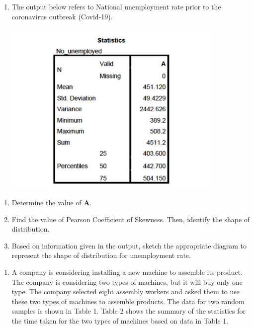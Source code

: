 \documentclass[
  a4paper,
  DIV=11,
  numbers=noendperiod,
  oneside]{scrreprt}
\providecommand{\tightlist}{%
  \setlength{\itemsep}{0pt}\setlength{\parskip}{0pt}}\usepackage{longtable,booktabs,array}
\begin{document}
\begin{enumerate}
\def\labelenumi{\arabic{enumi}.}
\setcounter{enumi}{4}
\tightlist
\item
  The output below refers to National unemployment rate prior to the
  coronavirus outbreak (Covid-19).

  \includegraphics[width=4.16667in,height=\textheight]{images/ch2/picture23.png}
\end{enumerate}

\begin{enumerate}
\def\labelenumi{\alph{enumi}.}
\tightlist
\item
  Determine the value of \textbf{A}.
\item
  Find the value of Pearson Coefficient of Skewness. Then, identify the
  shape of distribution.
\item
  Based on information given in the output, sketch the appropriate
  diagram to represent the shape of distribution for unemployment rate.
\end{enumerate}

\begin{enumerate}
\def\labelenumi{\arabic{enumi}.}
\setcounter{enumi}{5}
\tightlist
\item
  A company is considering installing a new machine to assemble its
  product. The company is considering two types of machines, but it will
  buy only one type. The company selected eight assembly workers and
  asked them to use these two types of machines to assemble products.
  The data for two random samples is shown in Table 1. Table 2 shows the
  summary of the statistics for the time taken for the two types of
  machines based on data in Table 1.
\end{enumerate}
\end{document}
